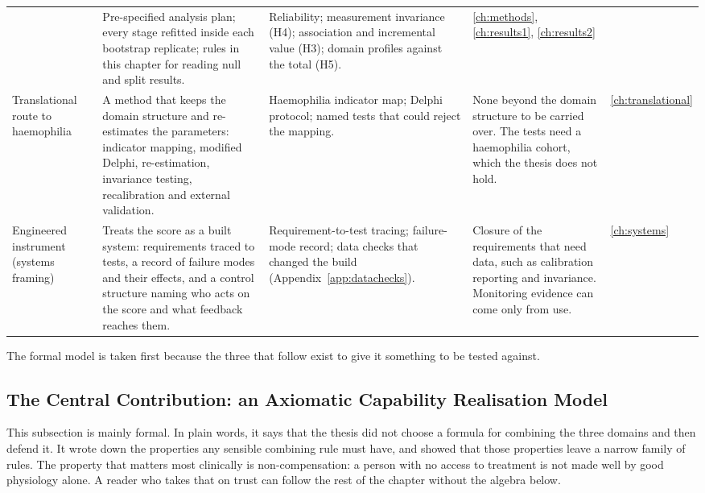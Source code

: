 {\begin{longtable}{>{\raggedright\arraybackslash}p{2.2cm} >{\raggedright\arraybackslash}p{3.4cm} >{\raggedright\arraybackslash}p{3.2cm} >{\raggedright\arraybackslash}p{3.2cm} >{\raggedright\arraybackslash}p{1.3cm}}
 & Pre-specified analysis plan; every stage refitted inside each bootstrap replicate; rules in this chapter for reading null and split results.
 & Reliability; measurement invariance (H4); association and incremental value (H3); domain profiles against the total (H5).
 & \ref{ch:methods}, \ref{ch:results1}, \ref{ch:results2} \\
Translational route to haemophilia
 & A method that keeps the domain structure and re-estimates the parameters: indicator mapping, modified Delphi, re-estimation, invariance testing, recalibration and external validation.
 & Haemophilia indicator map; Delphi protocol; named tests that could reject the mapping.
 & None beyond the domain structure to be carried over. The tests need a haemophilia cohort, which the thesis does not hold.
 & \ref{ch:translational} \\
Engineered instrument (systems framing)
 & Treats the score as a built system: requirements traced to tests, a record of failure modes and their effects, and a control structure naming who acts on the score and what feedback reaches them.
 & Requirement-to-test tracing; failure-mode record; data checks that changed the build (Appendix~\ref{app:datachecks}).
 & Closure of the requirements that need data, such as calibration reporting and invariance. Monitoring evidence can come only from use.
 & \ref{ch:systems} \\
\bottomrule
\end{longtable}
}

The formal model is taken first because the three that follow exist to give
it something to be tested against.

\subsection{The Central Contribution: an Axiomatic Capability Realisation Model}

This subsection is mainly formal. In plain words, it says that the thesis did
not choose a formula for combining the three domains and then defend it. It
wrote down the properties any sensible combining rule must have, and showed
that those properties leave a narrow family of rules. The property that matters
most clinically is non-compensation: a person with no access to treatment is not
made well by good physiology alone. A reader who takes that on trust can follow
the rest of the chapter without the algebra below.

